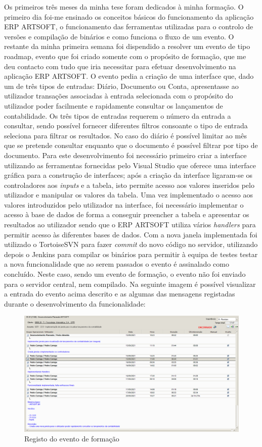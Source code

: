 \documentclass[sigplan]{acmart}
\begin{document}
Os primeiros três meses da minha tese foram dedicados à minha formação. O primeiro dia foi-me ensinado os conceitos básicos do funcionamento da aplicação ERP ARTSOFT, o funcionamento das ferramentas utilizadas para o controlo de versões e compilação de binários e como funciona o fluxo de um evento. O restante da minha primeira semana foi dispendido a resolver um evento de tipo roadmap, evento que foi criado somente com o propósito de formação, que me deu contacto com tudo que iria necessitar para efetuar desenvolvimento na aplicação ERP ARTSOFT. O evento pedia a criação de uma interface que, dado um de três tipos de entradas: Diário, Documento ou Conta, apresentasse ao utilizador transações associadas à entrada selecionada com o propósito do utilizador poder facilmente e rapidamente consultar os lançamentos de contabilidade. Os três tipos de entradas requerem o número da entrada a consultar, sendo possível fornecer diferentes filtros consoante o tipo de entrada seleciona para filtrar os resultados. No caso do diário é possível limitar ao mês que se pretende consultar enquanto que o documento é possível filtrar por tipo de documento. Para este desenvolvimento foi necessário primeiro criar a interface utilizando as ferramentas fornecidas pelo Visual Studio que oferece uma interface gráfica para a construção de interfaces; após a criação da interface ligaram-se os controladores aos \textit{inputs} e a tabela, isto permite acesso aos valores inseridos pelo utilizador e manipular os valores da tabela. Uma vez implementado o acesso aos valores introduzidos pelo utilizador na interface, foi necessário implementar o acesso à base de dados de forma a conseguir preencher a tabela e apresentar os resultados ao utilizador sendo que o ERP ARTSOFT utiliza vários \textit{handlers} para permitir acesso às diferentes bases de dados. Com a nova janela implementada foi utilizado o TortoiseSVN para fazer \textit{commit} do novo código no servidor, utilizando depois o Jenkins para compilar os binários para permitir à equipa de testes testar a nova funcionalidade que ao serem passados o evento é assinalado como concluído. Neste caso, sendo um evento de formação, o evento não foi enviado para o servidor central, nem compilado. Na seguinte imagem é possível visualizar a entrada do evento acima descrito e as algumas das mensagens registadas durante o desenvolvimento da funcionalidade:
\FloatBarrier
\begin{figure}[htbp]
	\centerline{\includegraphics[width=\linewidth]{figures/evento_formacao.png}}
	\caption{Registo do evento de formação}
	\label{fig2}
\end{figure}
\end{document}
